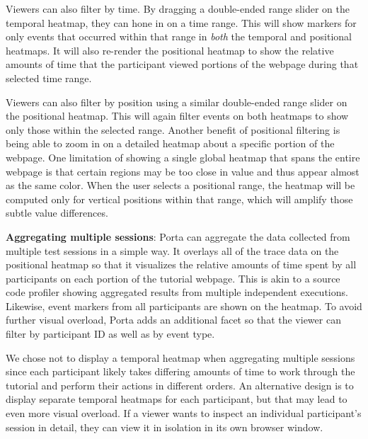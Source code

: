 Viewers can also filter by time. By dragging a double-ended range
slider on the temporal heatmap, they can hone in on a time range. This
will show markers for only events that occurred within that range in
\emph{both} the temporal and positional heatmaps. It will also re-render the
positional heatmap to show the relative amounts of time that the
participant viewed portions of the webpage during that selected time
range.

Viewers can also filter by position using a similar double-ended range
slider on the positional heatmap. This will again filter events on
both heatmaps to show only those within the selected range.
%
Another benefit of positional filtering is being able to zoom in on a
detailed heatmap about a specific portion of the webpage.
%
One limitation of showing a single global heatmap that spans the entire
webpage is that certain regions may be too close in value and thus
appear almost as the same color. When the user selects a positional
range, the heatmap will be computed only for vertical positions within
that range, which will amplify those subtle value differences.


\textbf{Aggregating multiple sessions}: Porta can aggregate the data
collected from multiple test sessions in a simple way. It overlays all
of the trace data on the positional heatmap so that it visualizes the
relative amounts of time spent by all participants on each portion of
the tutorial webpage. This is akin to a source code profiler showing
aggregated results from multiple independent executions. Likewise, event
markers from all participants are shown on the heatmap. To avoid further
visual overload, Porta adds an additional facet so that the viewer can
filter by participant ID as well as by event type.

We chose not to display a temporal heatmap when aggregating multiple
sessions since each participant likely takes differing amounts of time to
work through the tutorial and perform their actions in different
orders.
%
An alternative design is to display separate temporal heatmaps for each
participant, but that may lead to even more visual overload.
%
If a viewer wants to inspect an individual participant's session in
detail, they can view it in isolation in its own browser window.
